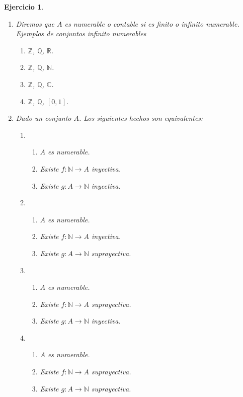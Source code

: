 \documentclass[twoside,12pt,a4 paper,openright]{book}
\newtheorem{ejer}[claim]{Ejercicio}
\begin{document}
\begin{ejer}
\begin{enumerate}
\newpage



\item Diremos que  $A$ es numerable o contable si es finito o infinito numerable.
  Ejemplos de conjuntos infinito numerables
        {\small
    \begin{enumerate}
            \item[\textcolor{red}{$\bullet$}] {} $\mathbb{Z}$,  $\mathbb{Q}$, $\mathbb R$.
             \item[\textcolor{blue}{$\bullet$}] {} $\mathbb{Z}$,  $\mathbb{Q}$, $\mathbb N$.
      \item[\textcolor{yellow}{$\bullet$}] {}     $\mathbb{Z}$,  $\mathbb{Q}$, $\mathbb C$.
         \item[\textcolor{green}{$\bullet$}] {}    $\mathbb{Z}$,  $\mathbb{Q}$, $[0,1]$.
                 \end{enumerate}
}



\newpage




\item Dado un conjunto $A$. Los siguientes hechos son equivalentes: 
          {\small
    \begin{enumerate}
\item[\textcolor{red}{$\bullet$}] {} \begin{enumerate}
 \item    $A$ es numerable. 
\item Existe  $f: \mathbb N \to A$ inyectiva.
\item Existe $g: A \to \mathbb N$ inyectiva.
\end{enumerate} 
\item[\textcolor{blue}{$\bullet$}] {} \begin{enumerate}
 \item $A$ es numerable. 
\item Existe  $f: \mathbb N \to A$ inyectiva.
\item Existe $g: A \to \mathbb N$ suprayectiva.
\end{enumerate} 
 \item[\textcolor{yellow}{$\bullet$}] {} \begin{enumerate}
 \item $A$ es numerable. 
\item Existe  $f: \mathbb N \to A$ suprayectiva.
\item Existe $g: A \to \mathbb N$ inyectiva.
\end{enumerate} 
\item[\textcolor{green}{$\bullet$}] {} \begin{enumerate}
 \item $A$ es numerable. 
\item Existe  $f: \mathbb N \to A$ suprayectiva.
\item Existe $g: A \to \mathbb N$ suprayectiva.
\end{enumerate} 
\end{enumerate} 
}


\end{enumerate}
\end{ejer}
\end{document}
